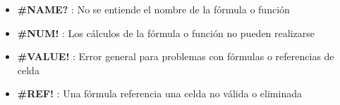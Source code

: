 \begin{description}
{\begin{description}
{\begin{itemize}
            \item {\textbf{\#NAME?} : No se entiende el nombre de la fórmula o función}
            \item {\textbf{\#NUM!} : Los cálculos de la fórmula o función no pueden realizarse}
            \item {\textbf{\#VALUE!} : Error general para problemas con fórmulas o referencias de celda}
            \item {\textbf{\#REF!} : Una fórmula referencia una celda no válida o eliminada}
        \end{itemize}} 
    \end{description}}
\end{description}



